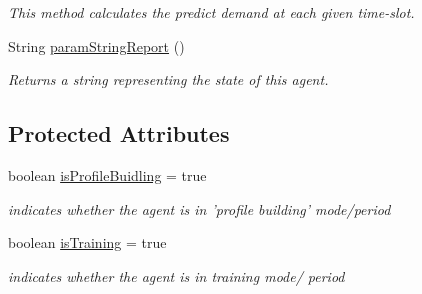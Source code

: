 \begin{DoxyCompactItemize}
\begin{DoxyCompactList}\small\item\em This method calculates the predict demand at each given time-\/slot. \end{DoxyCompactList}\item 
String \hyperlink{classuk_1_1ac_1_1dmu_1_1iesd_1_1cascade_1_1agents_1_1aggregators_1_1_supplier_co_afd9d8d5731c31726e15b15d179765ea5}{param\-String\-Report} ()
\begin{DoxyCompactList}\small\item\em Returns a string representing the state of this agent. \end{DoxyCompactList}\end{DoxyCompactItemize}
\subsection*{Protected Attributes}
\begin{DoxyCompactItemize}
\item 
\hypertarget{classuk_1_1ac_1_1dmu_1_1iesd_1_1cascade_1_1agents_1_1aggregators_1_1_supplier_co_a2748de0e3abda62bf22a2ba2c29e42f3}{boolean \hyperlink{classuk_1_1ac_1_1dmu_1_1iesd_1_1cascade_1_1agents_1_1aggregators_1_1_supplier_co_a2748de0e3abda62bf22a2ba2c29e42f3}{is\-Profile\-Buidling} = true}\label{classuk_1_1ac_1_1dmu_1_1iesd_1_1cascade_1_1agents_1_1aggregators_1_1_supplier_co_a2748de0e3abda62bf22a2ba2c29e42f3}

\begin{DoxyCompactList}\small\item\em indicates whether the agent is in 'profile building' mode/period \end{DoxyCompactList}\item 
\hypertarget{classuk_1_1ac_1_1dmu_1_1iesd_1_1cascade_1_1agents_1_1aggregators_1_1_supplier_co_a7cfc59cdd134554d09f7bbb8003fd19e}{boolean \hyperlink{classuk_1_1ac_1_1dmu_1_1iesd_1_1cascade_1_1agents_1_1aggregators_1_1_supplier_co_a7cfc59cdd134554d09f7bbb8003fd19e}{is\-Training} = true}\label{classuk_1_1ac_1_1dmu_1_1iesd_1_1cascade_1_1agents_1_1aggregators_1_1_supplier_co_a7cfc59cdd134554d09f7bbb8003fd19e}

\begin{DoxyCompactList}\small\item\em indicates whether the agent is in training mode/ period \end{DoxyCompactList}\end{DoxyCompactItemize}
